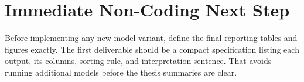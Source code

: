 \documentclass[11pt]{article}
\begin{document}
\section{Immediate Non-Coding Next Step}

Before implementing any new model variant, define the final reporting tables
and figures exactly. The first deliverable should be a compact specification
listing each output, its columns, sorting rule, and interpretation sentence.
That avoids running additional models before the thesis summaries are clear.
\end{document}
